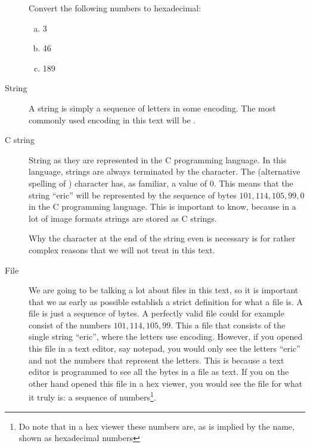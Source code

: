 \begin{description}
\begin{Exercise}[label={hex-to-n}]
  \end{Exercise}

  \begin{Exercise}[label={n-to-hex}]
    Convert the following numbers to hexadecimal:

    \begin{enumerate}[(a)]
    \item 3
    \item 46
    \item 189
    \end{enumerate}

  \end{Exercise}


\item[String] A string is simply a sequence of letters in some
  encoding. The most commonly used encoding in this text will be \ascii
  \cite{rfc20}.

\item[C string] String as they are represented in the C programming
  language. In this language, strings are always terminated by the
  \nul character\cite{kernighan1988c}. The \nullm(alternative spelling
  of \nul) character has, as familiar, a value of $0$. This means that
  the string ``eric'' will be represented by the sequence of bytes
  $101,114,105,99, 0$ in the C programming language. This is important
  to know, because in a lot of image formats strings are stored as C
  strings.

  Why the \nullm character at the end of the string even is necessary
  is for rather complex reasons that we will not treat in this text.

\item[File] We are going to be talking a lot about files in this text,
  so it is important that we as early as possible establish a strict
  definition for what a file is. A file is just a sequence of bytes. A
  perfectly valid file could for example consist of the numbers
  $101,114,105,99$. This a file that consists of the single string
  ``eric'', where the letters use \ascii encoding. However, if you
  opened this file in a text editor, say notepad, you would only see
  the letters ``eric'' and not the numbers that represent the
  letters. This is because a text editor is programmed to see all the
  bytes in a file as text. If you on the other hand opened this file
  in a hex viewer, you would see the file for what it truly is: a
  sequence of numbers\footnote{Do note that in a hex viewer these
    numbers are, as is implied by the name, shown as hexadecimal
    numbers}.


\end{description}
